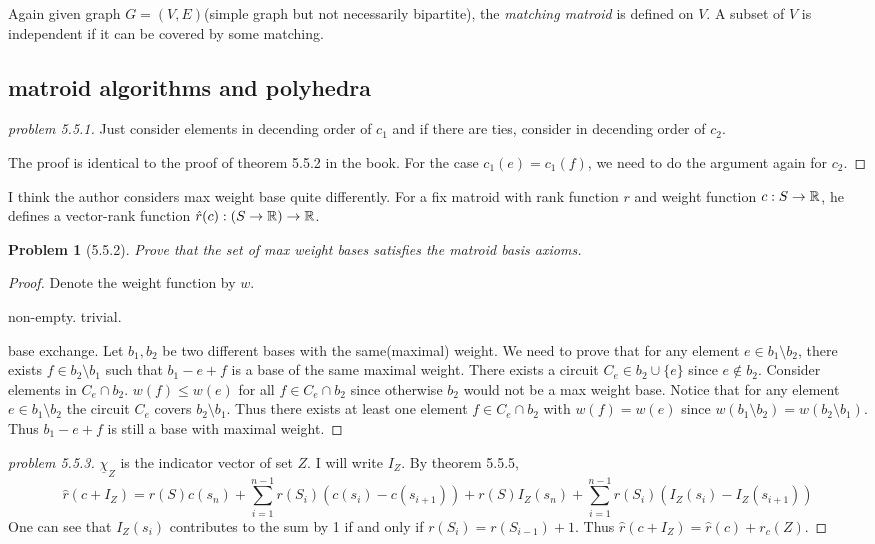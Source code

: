 \documentclass[12pt]{article}
\newtheorem*{nproblem}{Problem}
\begin{document}
Again given graph $G=(V,E)$(simple graph but not necessarily bipartite), the \emph{matching matroid} is defined on $V$. A subset of $V$ is independent if it can be covered by some matching. 

\subsection{matroid algorithms and polyhedra}
\begin{proof}[problem 5.5.1]
    Just consider elements in decending order of $c_1$ and if there are ties, consider in decending order of $c_2$.

    The proof is identical to the proof of theorem 5.5.2 in the book. For the case $c_1(e)=c_1(f)$, we need to do the argument again for $c_2$.
\end{proof}

I think the author considers max weight base quite differently. For a fix matroid with rank function $r$ and weight function $c:S\to \R$, he defines a vector-rank function $\hat{r}(c):(S\to \R )\to \R$.

\begin{nproblem}[5.5.2]
    Prove that the set of max weight bases satisfies the matroid basis axioms.
\end{nproblem}
\begin{proof}
    Denote the weight function by $w$.

    non-empty. trivial.

    base exchange. Let $b_1,b_2$ be two different bases with the same(maximal) weight. We need to prove that for any element $e\in b_1\setminus b_2$, there exists $f\in b_2\setminus b_1$ such that $b_1-e+f$ is a base of the same maximal weight. There exists a circuit $C_e\in b_2\cup\{e\}$ since $e\notin b_2$. Consider elements in $C_e\cap b_2$. $w(f)\leq w(e)$ for all $f\in C_e\cap b_2$ since otherwise $b_2$ would not be a max weight base. Notice that for any element $e\in b_1\setminus b_2$ the circuit $C_e$ covers $b_2\setminus b_1$. Thus there exists at least one element $f\in C_e\cap b_2$ with $w(f)=w(e)$ since $w(b_1\setminus b_2)=w(b_2\setminus b_1)$. Thus $b_1-e+f$ is still a base with maximal weight.
\end{proof}

\begin{proof}[problem 5.5.3]
    $\underline{\chi}_{Z}$ is the indicator vector of set $Z$. I will write $I_Z$. By theorem 5.5.5, 
    \[
        \hat{r}(c+I_Z)=r(S)c(s_n)+\sum_{i=1}^{n-1} r(S_i)\left( c(s_i)-c(s_{i+1})\right)+r(S)I_Z(s_n)+\sum_{i=1}^{n-1} r(S_i)\left( I_Z(s_i)-I_Z(s_{i+1})\right)
    \]
    One can see that $I_Z(s_i)$ contributes to the sum by 1 if and only if $r(S_i)=r(S_{i-1})+1$. Thus $\hat{r}(c+I_Z)=\hat r(c)+r_c(Z)$.

\end{proof}
\end{document}

